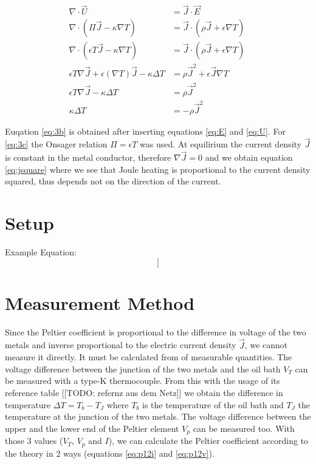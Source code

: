 \documentclass[a4paper]{article}
\begin{document}
\begin{subequations}
\begin{align}
	\nabla \cdot \vec{U} &= \vec{J} \cdot \vec{E} \\
	\nabla \cdot \left( \Pi \vec{J} - \kappa \nabla T \right) &= \vec{J} \cdot \left( \rho \vec{J} + \epsilon \nabla T \right) \ \label{eq:3b} \\
	\nabla \cdot \left( \epsilon T \vec{J} - \kappa \nabla T \right) &= \vec{J} \cdot \left( \rho \vec{J} + \epsilon \nabla T \right) \ \label{eq:3c} \\
	\epsilon T \nabla \vec{J} + \epsilon \left( \nabla T \right) \vec{J} - \kappa \Delta T &= \rho \vec{J}^2 + \epsilon \vec{J} \nabla T \\
	\epsilon T \nabla \vec{J} - \kappa \Delta T &= \rho \vec{J}^2 \\
	\kappa \Delta T &= - \rho \vec{J}^2 \ \label{eq:jsquare}
\end{align}
\end{subequations}

Euqation \eqref{eq:3b} is obtained after inserting equations \eqref{eq:E} and \eqref{eq:U}. For \eqref{eq:3c} the Onsager relation $\Pi = \epsilon T$ was used. At equilirium the current density $\vec{J}$ is constant in the metal conductor, therefore $\nabla \vec{J} = 0$ and we obtain equation \eqref{eq:jsquare} where we see that Joule heating is proportional to the current density squared, thus depends not on the direction of the current.

\section{Setup}
Example Equation:
\begin{equation}
[[EQ1]]
\label{eq:Example Equation}
\end{equation}
\section{Measurement Method}

Since the Peltier coefficient is proportional to the difference in voltage of the two metals and inverse proportional to the electric current density $\vec{J}$, we cannot measure it directly. It must be calculated from of measurable quantities.
\newline
The voltage difference between the junction of the two metals and the oil bath $V_T$ can be measured with a type-K thermocouple. From this with the usage of its reference table [[TODO: refernz aus dem Netz]] we obtain the difference in temperature $\Delta T = T_{b} - T_J$ where $T_b$ is the temperature of the oil bath and $T_J$ the temperature at the junction of the two metals.
\newline
The voltage difference between the upper and the lower end of the Peltier element $V_p$ can be measured too.
\newline
With those 3 values ($V_T$, $V_p$ and $I$), we can calculate the Peltier coefficient according to the theory in 2 ways (equations \eqref{eq:p12i} and \eqref{eq:p12v}).
\end{document}
